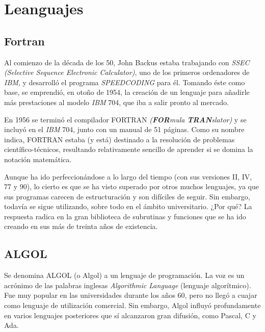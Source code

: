 \documentclass[twoside,twocolumn]{article}
\begin{document}


\section{Leanguajes}

\subsection{Fortran}

Al comienzo de la década de los 50, John Backus
estaba trabajando con \textit{SSEC (Selective Sequence Electronic Calculator)}, uno de los primeros ordenadores de
\textit{\textit{IBM}}, y desarrolló el programa \textit{SPEEDCODING} para él.
Tomando éste como base, se emprendió, en otoño de
1954, la creación de un lenguaje para añadirle más
prestaciones al modelo \textit{IBM} 704, que iba a salir pronto
al mercado.

En 1956 se terminó el compilador FORTRAN
\textit{(\textbf{FOR}mula \textbf{TRAN}slator)} y se incluyó en el \textit{IBM} 704,
junto con un manual de 51 páginas.
Como su nombre indica, FORTRAN estaba (y está)
destinado a la resolución de problemas científico-técnicos, resultando relativamente sencillo de aprender si se
domina la notación matemática.

Aunque ha ido perfeccionándose a lo largo del
tiempo (con sus versiones II, IV, 77 y 90), lo cierto es
que se ha visto superado por otros muchos lenguajes,
ya que sus programas carecen de estructuración y son
difíciles de seguir. Sin embargo, todavía se
sigue utilizando, sobre todo en el ámbito universitario.
¿Por qué? La respuesta radica en la gran biblioteca de
subrutinas y funciones que se ha ido creando en sus
más de treinta años de existencia.

\subsection{ALGOL}

Se denomina ALGOL (o Algol) a un lenguaje de programación. La voz es un acrónimo de las palabras inglesas \textit{Algorithmic Language} (lenguaje algorítmico). Fue muy popular en las universidades durante los años 60, pero no llegó a cuajar como lenguaje de utilización comercial. Sin embargo, Algol influyó profundamente en varios lenguajes posteriores que sí alcanzaron gran difusión, como Pascal, C y Ada.
\end{document}
